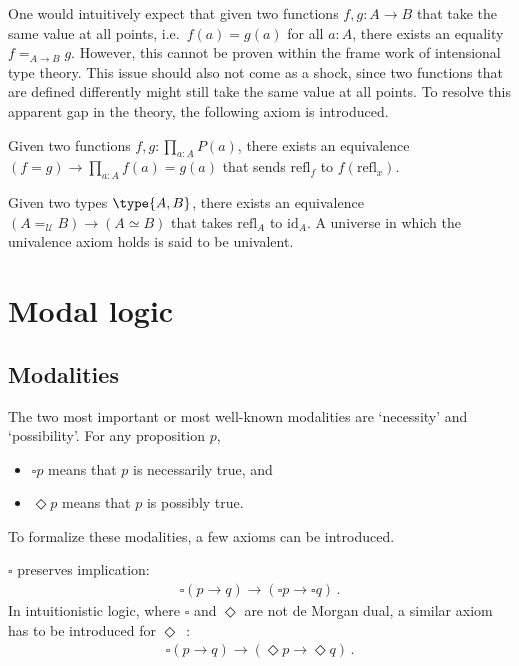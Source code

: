     One would intuitively expect that given two functions $f,g:A\rightarrow B$ that take the same value at all points, i.e.~$f(a)=g(a)$ for all $a:A$, there exists an equality $f=_{A\rightarrow B}g$. However, this cannot be proven within the frame work of intensional type theory. This issue should also not come as a shock, since two functions that are defined differently might still take the same value at all points. To resolve this apparent gap in the theory, the following axiom is introduced.
    \begin{axiom}
        Given two functions $f,g:\prod_{a:A}P(a)$, there exists an equivalence $(f=g)\rightarrow\prod_{a:A}f(a)=g(a)$ that sends $\mathrm{refl}_f$ to $f(\mathrm{refl}_x)$.
    \end{axiom}
    \begin{axiom}
        Given two types $\type{A,B}$, there exists an equivalence $(A=_{\mathcal{U}}B)\rightarrow(A\simeq B)$ that takes $\mathrm{refl}_A$ to $\mathrm{id}_A$. A universe in which the univalence axiom holds is said to be univalent.
    \end{axiom}

\section{Modal logic}\label{section:modal_logic}
\subsection{Modalities}

    The two most important or most well-known modalities are `necessity' and `possibility'. For any proposition $p$,
    \begin{itemize}
        \item $\square p$ means that $p$ is necessarily true, and
        \item $\Diamond p$ means that $p$ is possibly true.
    \end{itemize}
    To formalize these modalities, a few axioms can be introduced.

    \begin{axiom}[K]
        $\square$ preserves implication:
        \begin{gather}
            \square(p\rightarrow q)\rightarrow(\square p\rightarrow\square q)\,.
        \end{gather}
        In intuitionistic logic, where $\square$ and $\Diamond$ are not de Morgan dual, a similar axiom has to be introduced for $\Diamond$~\citep{simpson_proof_1994}:
        \begin{gather}
            \square(p\rightarrow q)\rightarrow(\Diamond p\rightarrow\Diamond q)\,.
        \end{gather}
    \end{axiom}

